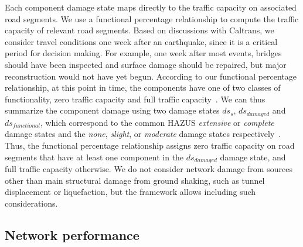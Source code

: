 Each component damage state maps directly to the traffic capacity on associated road segments. We use a functional percentage relationship to compute the traffic capacity of relevant road segments. Based on discussions with Caltrans, we consider travel conditions one week after an earthquake, since it is a critical period for decision making. For example, one week after most events, bridges should have been inspected and surface damage should be repaired, but major reconstruction would not have yet begun. According to our functional percentage relationship, at this point in time, the components have one of two classes of functionality, zero traffic capacity and full traffic capacity~\cite{werner_redars_2006}. We can thus summarize the component damage using two damage states $ds_s$, $ds_{damaged}$ and $ds_{functional}$, which correspond to the common HAZUS \emph{extensive} or \emph{complete} damage states and the \emph{none}, \emph{slight}, or \emph{moderate} damage states respectively~\cite{werner_redars_2006}. Thus, the functional percentage relationship assigns zero traffic capacity on road segments that have at least one component in the $ds_{damaged}$ damage state, and full traffic capacity otherwise.  We do not consider network damage from sources other than main structural damage from ground shaking, such as tunnel displacement or liquefaction, but the framework allows including such considerations. 




\subsection{Network performance}
